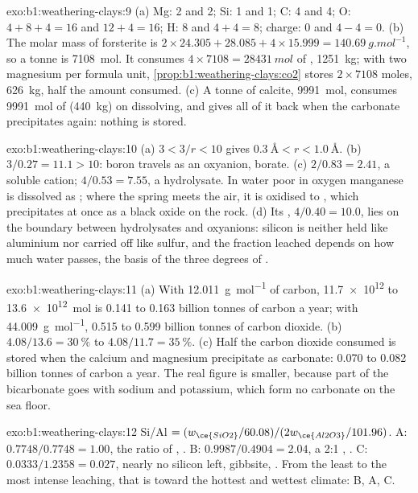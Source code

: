 \begin{solution}{exo:b1:weathering-clays:9}
(a) Mg: 2 and 2; Si: 1 and 1; C: 4 and 4; O: $4 + 8 + 4 = 16$ and $12 + 4 =
16$; H: 8 and $4 + 4 = 8$; charge: 0 and $4 - 4 = 0$. (b) The molar mass of
forsterite is $2\times24.305 + 28.085 + 4\times15.999 =
\qty{140.69}{g.mol^{-1}}$, so a tonne is \qty{7108}{mol}. It consumes
$4\times7108 = \qty{28431}{mol}$ of , \qty{1251}{kg}; with two
magnesium per formula unit, \cref{prop:b1:weathering-clays:co2} stores
$2\times7108$ moles, \qty{626}{kg}, half the amount consumed. (c) A tonne of
calcite, \qty{9991}{mol}, consumes \qty{9991}{mol} of  (\qty{440}{kg})
on dissolving, and gives all of it back when the carbonate precipitates again:
nothing is stored.
\end{solution}

\begin{solution}{exo:b1:weathering-clays:10}
(a) $3 < 3/r < 10$ gives $\qty{0.3}{\angstrom} < r < \qty{1.0}{\angstrom}$.
(b) $3/0.27 = 11.1 > 10$: boron travels as an oxyanion, borate. (c) $2/0.83 =
2.41$, a soluble cation; $4/0.53 = 7.55$, a hydrolysate. In water poor in
oxygen manganese is dissolved as ; where the spring meets the air,
it is oxidised to , which precipitates at once as a black oxide on
the rock. (d) Its , $4/0.40 = 10.0$, lies on the boundary
between hydrolysates and oxyanions: silicon is neither held like aluminium nor
carried off like sulfur, and the fraction leached depends on how much water
passes, the basis of the three degrees of .
\end{solution}

\begin{solution}{exo:b1:weathering-clays:11}
(a) With \qty{12.011}{g.mol^{-1}} of carbon, \num{11.7e12} to
\qty{13.6e12}{mol} is 0.141 to 0.163 billion tonnes of carbon a year; with
\qty{44.009}{g.mol^{-1}}, 0.515 to 0.599 billion tonnes of carbon dioxide.
(b) $4.08/13.6 = \qty{30}{\percent}$ to $4.08/11.7 = \qty{35}{\percent}$.
(c) Half the carbon dioxide consumed is stored when the calcium and magnesium
precipitate as carbonate: 0.070 to 0.082 billion tonnes of carbon a year. The
real figure is smaller, because part of the bicarbonate goes with sodium and
potassium, which form no carbonate on the sea floor.
\end{solution}

\begin{solution}{exo:b1:weathering-clays:12}
Si/Al $= (w_{\ce{SiO2}}/60.08)/(2w_{\ce{Al2O3}}/101.96)$. A: $0.7748/0.7748 =
1.00$, the ratio of , . B: $0.9987/0.4904 = 2.04$, a
2:1 , . C: $0.0333/1.2358 = 0.027$, nearly no
silicon left, gibbsite, . From the least to the most intense
leaching, that is toward the hottest and wettest climate: B, A, C.
\end{solution}

